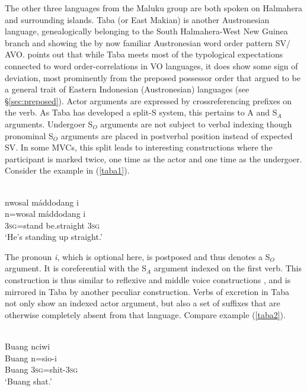 The other three languages from the Maluku group are both spoken on Halmahera and surrounding islands. Taba (or East Makian) is another Austronesian language, genealogically belonging to the South Halmahera-West New Guinea branch and showing the by now familiar Austronesian word order pattern SV/ AVO. \citet[144f.]{bowden2001taba} points out that while Taba meets most of the typological expectations connected to word order-correlations in VO languages, it does show some sign of deviation, most prominently from the preposed possessor order that \citet{Himmelmann2005austronesian} argued to be a general trait of Eastern Indonesian (Austronesian) languages (see §\ref{sec:preposed}). Actor arguments are expressed by crossreferencing prefixes on the verb. As Taba has developed a split-S system, this pertains to A and S$_A$ arguments. Undergoer S$_O$ arguments are not subject to verbal indexing though pronominal S$_O$ arguments are placed in postverbal position instead of expected SV. In some MVCs, this split leads to interesting constructions where the participant is marked twice, one time as the actor and one time as the undergoer. Consider the example in (\ref{taba1}).

\ea \label{taba1}
\\
\glll nwosal máddodang i \\
n=wosal máddodang i \\
\textsc{3}\textsc{sg}=stand be.straight \textsc{3}\textsc{sg} \\
\glft `He's standing up straight.'  
\z

The pronoun \textit{i}, which is optional here, is postposed and thus denotes a S$_O$ argument. It is coreferential with the S$_A$ argument indexed on the first verb. This construction is thus similar to reflexive and middle voice constructions \citep[301]{bowden2001taba}, and is mirrored in Taba by another peculiar construction. Verbs of excretion in Taba not only show an indexed actor argument, but also a set of suffixes that are otherwise completely absent from that language. Compare example (\ref{taba2}).

\ea \label{taba2}
\\
\glll Buang nciwi \\
Buang n=sio-i \\
Buang \textsc{3}\textsc{sg}=shit-\textsc{3}\textsc{sg} \\
\glft `Buang shat.' 
\z

